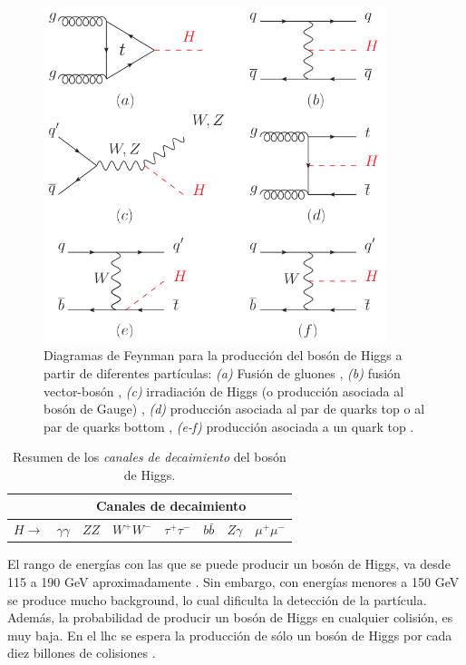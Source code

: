 \begin{figure}[h]
  \centering
  \includegraphics[width=10cm]{figures/image8.png}
  \caption[Diagramas de Feynman para la producción del bosón de Higgs.]{Diagramas de Feynman para la producción del bosón de Higgs a partir de diferentes partículas: \emph{(a)} Fusión de gluones \cite{glover1988higgs}, \emph{(b)} fusión vector-bosón \cite{Dicus1985}, \emph{(c)} irradiación de Higgs (o producción asociada al bosón de Gauge) \cite{Brein2013vh}, \emph{(d)} producción asociada al par de quarks top \cite{kunszt1984associated} o al par de quarks bottom \cite{khachatryan2015search}, \emph{(e-f)} producción asociada a un quark top \cite{maltoni2001associated}.
  }
  \label{fig:pchan}
\end{figure}

\begin{table}[h]
\centering
\begin{tabular}{c|c|c|c|c|c|c|c|}
\cline{2-8}
 & \multicolumn{7}{c|}{Canales de decaimiento} \\ \hline
\multicolumn{1}{|l|}{$H \rightarrow$} & $\gamma\gamma$ & $ZZ$ & $W^+ W^-$ & $\tau^+ \tau^-$ & $b\bar{b}$ & $Z\gamma$ & $\mu^+ \mu^-$ \\ \hline
\end{tabular}
\caption[Resumen de los \textit{canales de decaimiento} del bosón de Higgs.]{Resumen de los \textit{canales de decaimiento} del bosón de Higgs. 
}
\label{tab:decays}
\end{table}

El rango de energías con las que se puede producir un bosón de Higgs, va desde 115 a 190 GeV aproximadamente \cite{al2006}. Sin embargo, con energías menores a 150 GeV se produce mucho background, lo cual dificulta la detección de la partícula. Además, la probabilidad de producir un bosón de Higgs en cualquier colisión, es muy baja. En el \acrshort{lhc} se espera la producción de sólo un bosón de Higgs por cada diez billones de colisiones \cite{Baglio2011}.

